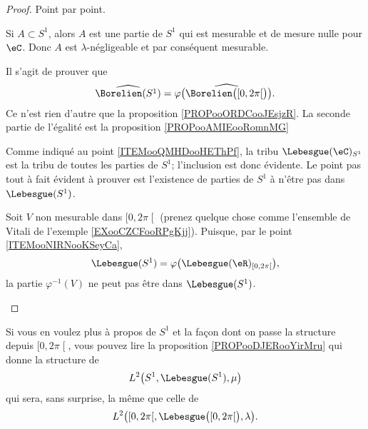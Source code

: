 \begin{proof}
	Point par point.
	\begin{subproof}
		\item[Pour \ref{ITEMooQMHDooHEThPf}]
		Si \( A\subset S^1\), alors \( A\) est une partie de \( S^1\) qui est mesurable et de mesure nulle pour \( \eC\). Donc \( A\) est \( \lambda\)-négligeable et par conséquent mesurable.
		\item[Pour \ref{ITEMooNIRNooKSeyCa}]
		Il s'agit de prouver que
		\begin{equation}
			\widehat{\Borelien(S^1)}=\varphi\big( \widehat{\Borelien\big( \mathopen[ 0 , 2\pi \mathclose[ \big)} \big).
		\end{equation}
		Ce n'est rien d'autre que la proposition \ref{PROPooORDCooJEsjzR}. La seconde partie de l'égalité est la proposition \ref{PROPooAMIEooRomnMG}
		\item[Pour \ref{ITEMooXDBTooYnauyi}]
		Comme indiqué au point \ref{ITEMooQMHDooHEThPf}, la tribu \( \Lebesgue(\eC)_{S^1}\) est la tribu de toutes les parties de \( S^1\); l'inclusion est donc évidente. Le point pas tout à fait évident à prouver est l'existence de parties de \( S^1\) à n'être pas dans \( \Lebesgue(S^1)\).

		Soit \( V\) non mesurable dans \( \mathopen[ 0 , 2\pi \mathclose[\) (prenez quelque chose comme l'ensemble de Vitali de l'exemple \ref{EXooCZCFooRPgKjj}). Puisque, par le point \ref{ITEMooNIRNooKSeyCa},
		\begin{equation}
			\Lebesgue(S^1)=\varphi\big( \Lebesgue(\eR)_{\mathopen[ 0 , 2\pi \mathclose[} \big),
		\end{equation}
		la partie \( \varphi^{-1}(V)\) ne peut pas être dans \( \Lebesgue(S^1)\).
	\end{subproof}
\end{proof}

Si vous en voulez plus à propos de \( S^1\) et la façon dont on passe la structure depuis \( \mathopen[ 0 , 2\pi \mathclose[\), vous pouvez lire la proposition \ref{PROPooDJERooYirMru} qui donne la structure de
\begin{equation}
	L^2\big( S^1,\Lebesgue(S^1), \mu \big)
\end{equation}
qui sera, sans surprise, la même que celle de
\begin{equation}
	L^2\big( \mathopen[ 0 , 2\pi \mathclose[,\Lebesgue\big( \mathopen[ 0 , 2\pi \mathclose[ \big), \lambda \big).
\end{equation}

